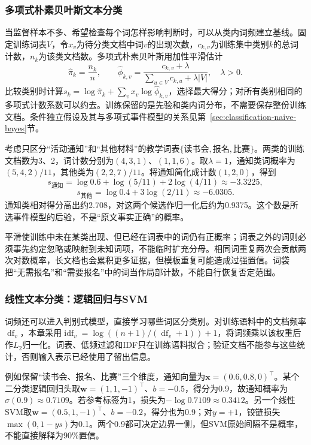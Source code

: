 \subsubsection{多项式朴素贝叶斯文本分类}
\label{sec:nlp-classification-naive-bayes}

当监督样本不多、希望检查每个词怎样影响判断时，可以从类内词频建立基线。固定训练词表$V$，令$x_v$为待分类文档中词$v$的出现次数，$c_{k,v}$为训练集中类别$k$的总词计数，$n_k$为该类文档数。多项式朴素贝叶斯用加性平滑估计
\[
  \widehat\pi_k=\frac{n_k}{n},\qquad
  \widehat\phi_{k,v}
  =\frac{c_{k,v}+\lambda}{\sum_{u\in V}c_{k,u}+\lambda|V|},
  \quad \lambda>0.
\]
比较类别时计算$s_k=\log\widehat\pi_k+\sum_vx_v\log\widehat\phi_{k,v}$，选择最大得分；对所有类别相同的多项式计数系数可以约去。训练保留的是先验和类内词分布，不需要保存整份训练文档。条件独立假设及其与多项式事件模型的关系见第~\ref{sec:classification-naive-bayes}节。

考虑只区分“活动通知”和“其他材料”的教学词表$\{\text{读书会},\text{报名},\text{比赛}\}$。两类的训练文档数为3、2，词计数分别为$(4,3,1)$、$(1,1,6)$。取$\lambda=1$，通知类词概率为$(5,4,2)/11$，其他类为$(2,2,7)/11$。将通知简化成计数$(1,2,0)$，得到
\[
  s_{\text{通知}}=\log0.6+\log(5/11)+2\log(4/11)
  \approx-3.3225,
\]
\[
  s_{\text{其他}}=\log0.4+3\log(2/11)\approx-6.0305.
\]
通知类相对得分高出约2.708，对这两个候选作归一化后约为0.9375。这个数是所选事件模型的后验，不是“原文事实正确”的概率。

平滑使训练中未在某类出现、但已经在词表中的词仍有正概率；词表之外的词则必须事先约定忽略或映射到未知词项，不能临时扩充分母。相同词重复两次会贡献两次对数概率，长文档也会累积更多证据，但模板重复可能造成过强置信。词袋把“无需报名”和“需要报名”中的词当作局部计数，不能自行恢复否定范围。

\subsubsection{线性文本分类：逻辑回归与SVM}
\label{sec:nlp-classification-linear}

词频还可以进入判别式模型，直接学习哪些词区分类别。对训练语料中的文档频率$\operatorname{df}_v$，本章采用$\operatorname{idf}_v=\log((n+1)/(\operatorname{df}_v+1))+1$，将词频乘以该权重后作$L_2$归一化。词表、低频过滤和IDF只在训练语料拟合；验证文档不能参与这些统计，否则输入表示已经使用了留出信息。

例如保留“读书会、报名、比赛”三个维度，通知向量为$\bm x=(0.6,0.8,0)^\top$。某个二分类逻辑回归头取$\bm w=(1,1,-1)^\top$、$b=-0.5$，得分为0.9，故通知概率为$\sigma(0.9)\approx0.7109$。若参考标签为1，损失为$-\log0.7109\approx0.3412$。另一个线性SVM取$\bm w=(0.5,1,-1)^\top$、$b=-0.2$，得分也为0.9；对$y=+1$，铰链损失$\max(0,1-ys)$为0.1。两个0.9都可决定边界一侧，但SVM原始间隔不是概率，不能直接解释为90\%置信。

